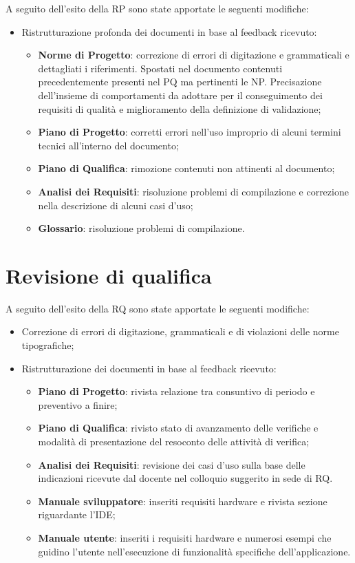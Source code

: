 \documentclass[openany,12pt,a4paper]{report}
\begin{document}
A seguito dell'esito della RP sono state apportate le seguenti modifiche:

\begin{itemize}
	\item Ristrutturazione profonda dei documenti in base al feedback ricevuto:
	\begin{itemize}
		\item \textbf{Norme di Progetto}: correzione di errori di digitazione e grammaticali e dettagliati i riferimenti. Spostati nel documento contenuti precedentemente presenti nel PQ ma pertinenti le NP. Precisazione dell'insieme di comportamenti da adottare per il conseguimento dei requisiti di qualità e miglioramento della definizione di validazione;
		\item \textbf{Piano di Progetto}: corretti errori nell'uso improprio di alcuni termini tecnici all'interno del documento;
		\item \textbf{Piano di Qualifica}: rimozione contenuti non attinenti al documento;
		\item \textbf{Analisi dei Requisiti}: risoluzione problemi di compilazione e correzione nella descrizione di alcuni casi d'uso;
		\item \textbf{Glossario}: risoluzione problemi di compilazione.
	\end{itemize}
\end{itemize}

\section{Revisione di qualifica}

A seguito dell'esito della RQ sono state apportate le seguenti modifiche:

\begin{itemize}
	\item Correzione di errori di digitazione, grammaticali e di violazioni delle norme tipografiche;
	\item Ristrutturazione dei documenti in base al feedback ricevuto:
	\begin{itemize}
		\item \textbf{Piano di Progetto}: rivista relazione tra consuntivo di periodo e preventivo a finire;
		\item \textbf{Piano di Qualifica}: rivisto stato di avanzamento delle verifiche e modalità di presentazione del resoconto delle attività di verifica;
		\item \textbf{Analisi dei Requisiti}: revisione dei casi d'uso sulla base delle indicazioni ricevute dal docente nel colloquio suggerito in sede di RQ.
		\item \textbf{Manuale sviluppatore}: inseriti requisiti hardware e rivista sezione riguardante l'IDE;
		\item \textbf{Manuale utente}: inseriti i requisiti hardware e numerosi esempi che guidino l'utente nell'esecuzione di funzionalità specifiche dell'applicazione. 
	\end{itemize}
\end{itemize}
\end{document}
